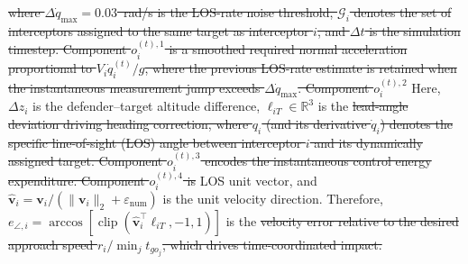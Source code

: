 \documentclass[lettersize,journal]{IEEEtran}
\providecommand{\DIFadd}[1]{{\protect\color{blue}#1}} %
\providecommand{\DIFdel}[1]{{\protect\color{red}\sout{#1}}}                      %
\providecommand{\DIFaddbegin}{} %
\providecommand{\DIFaddend}{} %
\providecommand{\DIFdelbegin}{} %
\providecommand{\DIFdelend}{} %
\newcommand{\DIFscaledelfig}{0.5}
\newlength{\DIFdelgraphicswidth} %
\newlength{\DIFdelgraphicsheight} %
\newcommand{\DIFaddincludegraphics}[2][]{{\color{blue}\fbox{\DIFOincludegraphics[#1]{#2}}}} %
\newcommand{\DIFdelincludegraphics}[2][]{%
\sbox{\DIFdelgraphicsbox}{\DIFOincludegraphics[#1]{#2}}%
\settoboxwidth{\DIFdelgraphicswidth}{\DIFdelgraphicsbox} %
\settoboxtotalheight{\DIFdelgraphicsheight}{\DIFdelgraphicsbox} %
\scalebox{\DIFscaledelfig}{%
\parbox[b]{\DIFdelgraphicswidth}{\usebox{\DIFdelgraphicsbox}\\[-\baselineskip] \rule{\DIFdelgraphicswidth}{0em}}\llap{\resizebox{\DIFdelgraphicswidth}{\DIFdelgraphicsheight}{%
\setlength{\unitlength}{\DIFdelgraphicswidth}%
\begin{picture}(1,1)%
\thicklines\linethickness{2pt} %
{\color[rgb]{1,0,0}\put(0,0){\framebox(1,1){}}}%
{\color[rgb]{1,0,0}\put(0,0){\line( 1,1){1}}}%
{\color[rgb]{1,0,0}\put(0,1){\line(1,-1){1}}}%
\end{picture}%
}\hspace*{3pt}}} %
} %
\DeclareRobustCommand{\DIFaddbegin}{\DIFOaddbegin \let\includegraphics\DIFaddincludegraphics} %
\DeclareRobustCommand{\DIFaddend}{\DIFOaddend \let\includegraphics\DIFOincludegraphics} %
\DeclareRobustCommand{\DIFdelbegin}{\DIFOdelbegin \let\includegraphics\DIFdelincludegraphics} %
\DeclareRobustCommand{\DIFdelend}{\DIFOaddend \let\includegraphics\DIFOincludegraphics} %
\begin{document}
\DIFdelbegin \DIFdel{where $\Delta\dot{q}_{\max} = 0.03$~rad/s is the LOS-rate noise threshold,
$\mathcal{G}_i$ denotes the set of interceptors assigned to the same target as interceptor $i$, and
$\Delta t$ is the
simulation timestep. Component $o_i^{(t),1}$ is a smoothed required normal acceleration proportional to $V_i \dot{q}_i^{(t)} / g$,
where the previous LOS-rate estimate is retained when the
instantaneous measurement jump exceeds $\Delta \dot{q}_{\max}$. Component $o_i^{(t),2}$ }\DIFdelend \DIFaddbegin \DIFadd{Here, $\Delta z_i$ is the defender--target altitude difference,
$\boldsymbol\ell_{iT}\in\mathbb R^3$ }\DIFaddend is the \DIFdelbegin \DIFdel{lead-angle deviation driving heading correction, where $q_i$ (and its derivative $\dot{q}_i$) denotes the specific line-of-sight (LOS) angle between interceptor $i$ and its dynamically assigned target. 
Component $o_i^{(t),3}$ encodes the instantaneous control energy expenditure. Component $o_i^{(t),4}$ is }\DIFdelend \DIFaddbegin \DIFadd{LOS unit vector, and
$\widehat{\mathbf v}_i=\mathbf v_i/(\|\mathbf v_i\|_2+\varepsilon_{\mathrm{num}})$ is the
unit velocity direction. Therefore,
$e_{\angle,i}=\arccos[\operatorname{clip}(\widehat{\mathbf v}_i^{\top}
\boldsymbol\ell_{iT},-1,1)]$ is }\DIFaddend the
\DIFdelbegin \DIFdel{velocity error relative to the desired approach speed $r_i / \min_j t_{go_j}$, which drives time-coordinated impact.
}%
\end{document}
